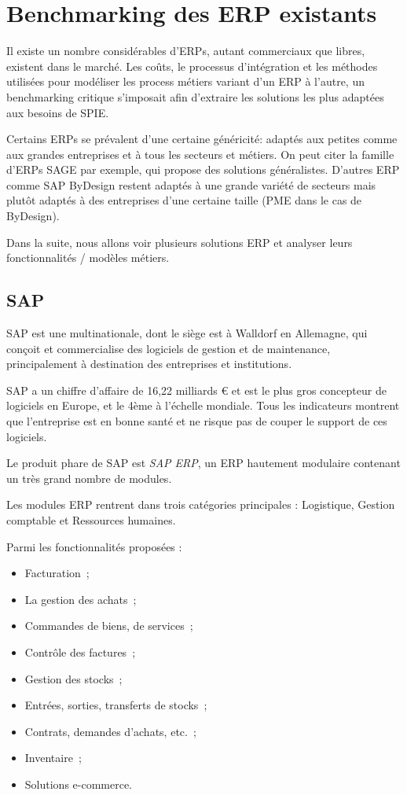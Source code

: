 \section{Benchmarking des ERP existants}

    Il existe un nombre considérables d'ERPs, autant commerciaux que libres, existent dans le marché. Les coûts, le processus d'intégration et les méthodes utilisées pour modéliser les process métiers variant d'un ERP à l'autre, un benchmarking critique s'imposait afin d'extraire les solutions les plus adaptées aux besoins de SPIE.

    Certains ERPs se prévalent d'une certaine généricité: adaptés aux petites comme aux grandes entreprises et à tous les secteurs et métiers. On peut citer la famille d'ERPs SAGE par exemple, qui propose des solutions généralistes. D'autres ERP comme SAP ByDesign restent adaptés à une grande variété de secteurs mais plutôt adaptés à des entreprises d'une certaine taille (PME dans le cas de ByDesign).

    Dans la suite, nous allons voir plusieurs solutions ERP et analyser leurs fonctionnalités / modèles métiers.

    \subsection{SAP}

        SAP est une multinationale, dont le siège est à Walldorf en Allemagne, qui conçoit et commercialise des logiciels de gestion et de maintenance, principalement à destination des entreprises et institutions.

        SAP a un chiffre d'affaire de 16,22 milliards € et est le plus gros concepteur de logiciels en Europe, et le 4ème à l'échelle mondiale. Tous les indicateurs montrent que l'entreprise est en bonne santé et ne risque pas de couper le support de ces logiciels.

        Le produit phare de SAP est \textit{SAP ERP}, un ERP hautement modulaire contenant un très grand nombre de modules.

        Les modules ERP rentrent dans trois catégories principales : Logistique, Gestion comptable et Ressources humaines.

        Parmi les fonctionnalités proposées :

        \begin{itemize}
            \item Facturation~;
            \item La gestion des achats~;
            \item Commandes de biens, de services~;
            \item Contrôle des factures~;
            \item Gestion des stocks~;
            \item Entrées, sorties, transferts de stocks~;
            \item Contrats, demandes d'achats, etc.~;
            \item Inventaire~;
            \item Solutions e-commerce.
        \end{itemize}


